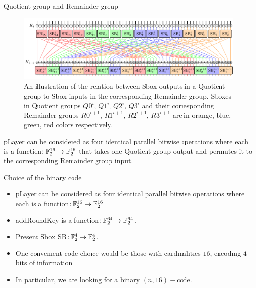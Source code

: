 \begin{frame}{Quotient group and Remainder group}
    \begin{figure}[htb]
    \centering
    \includegraphics[width=1.0\textwidth]{fig/PRESENT_Sbox_grouping.pdf}
    \caption{An illustration of the relation between Sbox outputs in a Quotient group to Sbox inputs in the corresponding Remainder group.
    Sboxes in Quotient groups $Q0^i$, $Q1^i$, $Q2^i$, $Q3^i$ and their corresponding Remainder groups $R0^{i+1}$, $R1^{i+1}$, $R2^{i+1}$, $R3^{i+1}$ are in \textcolor{orange!50}{orange}, \textcolor{blue!50}{blue}, \textcolor{green!50}{green}, \textcolor{red!50}{red} colors respectively.}
\end{figure}
pLayer can be considered as four identical parallel bitwise operations where each is a function$:{\mathbb F}_2^{16}\to{\mathbb F}_2^{16}$ that takes one Quotient group output and permutes it to the corresponding Remainder group input.
\end{frame}

\begin{frame}{Choice of the binary code}
    \begin{itemize}
        \item pLayer can be considered as four identical parallel bitwise operations where each is a function$:{\mathbb F}_2^{16}\to{\mathbb F}_2^{16}$
        \item addRoundKey is a function$:{\mathbb F}_2^{64}\to{\mathbb F}_2^{64}$.
     \item Present Sbox SB$:{\mathbb F}_2^{4}\to{\mathbb F}_2^{4}$.
      \item One convenient code choice would be those with cardinalities $16$, encoding $4$ bits of information.
     \item In particular, we are looking for a binary $(n,16)-$code.
    \end{itemize}
\end{frame}

